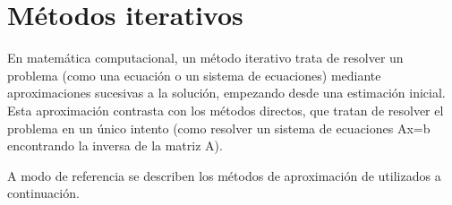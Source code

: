 \chapter{Métodos iterativos}\label{apx:met}

\par En matemática computacional, un método iterativo trata de resolver un problema (como una ecuación o un sistema de ecuaciones) mediante aproximaciones sucesivas a la solución, empezando desde una estimación inicial. Esta aproximación contrasta con los métodos directos, que tratan de resolver el problema en un único intento (como resolver un sistema de ecuaciones Ax=b encontrando la inversa de la matriz A).
\par A modo de referencia se describen los métodos de aproximación de utilizados a continuación.

